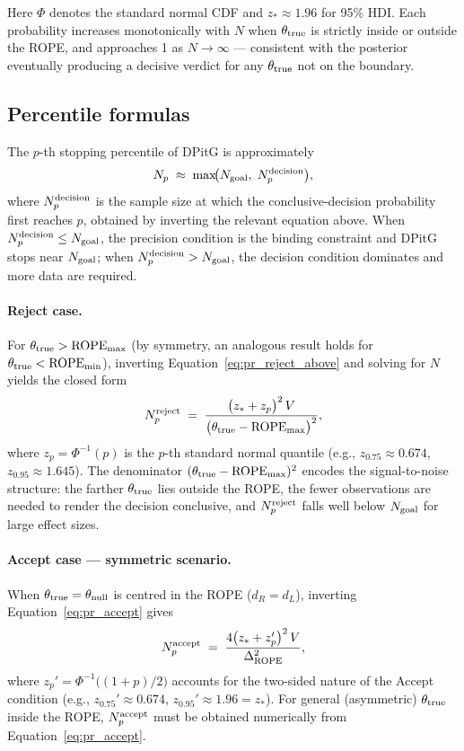 Here $\Phi$ denotes the standard normal CDF and $z_* \approx 1.96$ for 95\% HDI.
Each probability increases monotonically with $N$ when $\theta_{\rm true}$ is strictly inside
or outside the ROPE, and approaches 1 as $N \to \infty$ --- consistent with the posterior
eventually producing a decisive verdict for any $\theta_{\rm true}$ not on the boundary.

\subsection*{Percentile formulas}

The $p$-th stopping percentile of DPitG is approximately
\begin{equation}\label{eq:np_dpitg}
    N_p \;\approx\; \max\!\bigl(N_{\rm goal},\;N_p^{\rm decision}\bigr),
\end{equation}
where $N_p^{\rm decision}$ is the sample size at which the conclusive-decision probability
first reaches $p$, obtained by inverting the relevant equation above.
When $N_p^{\rm decision} \le N_{\rm goal}$, the precision condition is the binding constraint
and DPitG stops near $N_{\rm goal}$; when $N_p^{\rm decision} > N_{\rm goal}$, the decision
condition dominates and more data are required.

\paragraph{Reject case.}
For $\theta_{\rm true} > \mathrm{ROPE}_{\rm max}$ (by symmetry, an analogous result holds
for $\theta_{\rm true} < \mathrm{ROPE}_{\rm min}$), inverting Equation~\ref{eq:pr_reject_above}
and solving for $N$ yields the closed form
\begin{equation}\label{eq:np_reject}
    N_p^{\rm reject}
    \;=\;
    \frac{\bigl(z_* + z_p\bigr)^2\,V}{\bigl(\theta_{\rm true} - \mathrm{ROPE}_{\rm max}\bigr)^2},
\end{equation}
where $z_p = \Phi^{-1}(p)$ is the $p$-th standard normal quantile
(e.g., $z_{0.75} \approx 0.674$, $z_{0.95} \approx 1.645$).
The denominator $(\theta_{\rm true} - \mathrm{ROPE}_{\rm max})^2$ encodes the signal-to-noise
structure: the farther $\theta_{\rm true}$ lies outside the ROPE, the fewer observations are
needed to render the decision conclusive, and $N_p^{\rm reject}$ falls well below
$N_{\rm goal}$ for large effect sizes.

\paragraph{Accept case --- symmetric scenario.}
When $\theta_{\rm true} = \theta_{\rm null}$ is centred in the ROPE ($d_R = d_L$),
inverting Equation~\ref{eq:pr_accept} gives
\begin{equation}\label{eq:np_accept}
    N_p^{\rm accept}
    \;=\;
    \frac{4\bigl(z_* + z_p'\bigr)^2\,V}{\Delta_{\rm ROPE}^2},
\end{equation}
where $z_p' = \Phi^{-1}\!\bigl((1+p)/2\bigr)$ accounts for the two-sided nature of the
Accept condition (e.g., $z_{0.75}' \approx 0.674$, $z_{0.95}' \approx 1.96 = z_*$).
For general (asymmetric) $\theta_{\rm true}$ inside the ROPE, $N_p^{\rm accept}$ must be
obtained numerically from Equation~\ref{eq:pr_accept}.

